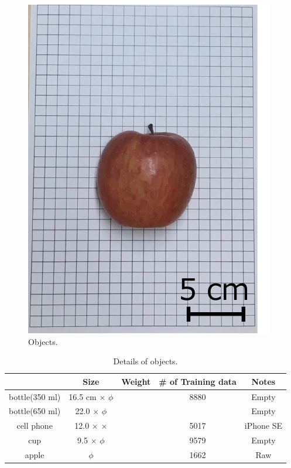\begin{figure}[H]
\begin{minipage}{0.19\columnwidth}
        \includegraphics[clip, width=\linewidth]{figure/chapter4/apple}
    \end{minipage}

    \caption{Objects.}
    \label{fig:対象物}
    
\end{figure}

\begin{table}[H]
    \centering
    \caption{Details of objects.}
    \begin{tabular}{ccccc}\toprule
        & Size & Weight & \# of Training data & Notes \\ \midrule
        bottle(350 ml) & 16.5 cm $\times$  $\phi$ &  & 8880 & Empty \\ 
        bottle(650 ml) & 22.0 $\times$  $\phi$ &  &  & Empty \\ 
        cell phone & 12.0 $\times$  $\times$  &  & 5017 & iPhone SE \\ 
        cup & 9.5 $\times$  $\phi$ &  & 9579 & Empty \\ 
        apple & $\phi$ &  & 1662 & Raw \\ \bottomrule
    \end{tabular}
    \label{tab:対象物}
\end{table}


